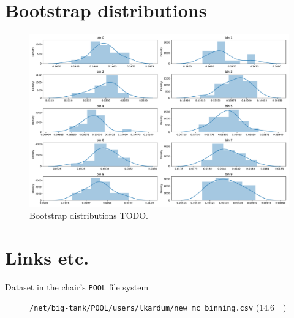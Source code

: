 
\section{Bootstrap distributions}
\begin{figure}
  \centering
  \includegraphics[width=\textwidth]{content/plots/halftime/bootstrap_distributions.pdf}
  \caption{Bootstrap distributions TODO.}
  \label{fig:bootstrap:distributions}
\end{figure}


\section{Links etc.}
\begin{description}
  \item[Dataset in the chair's \texttt{POOL} file system] \texttt{/net/big-tank/POOL/users/lkardum/new\_mc\_binning.csv} (\SI{14.6}{\giga\byte})
\end{description}
